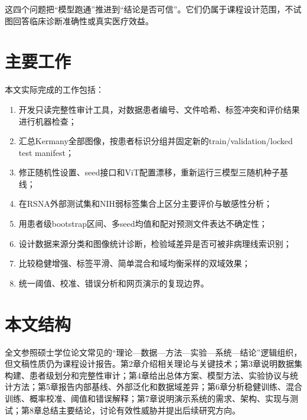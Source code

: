 这四个问题把“模型跑通”推进到“结论是否可信”。它们仍属于课程设计范围，不试图回答临床诊断准确性或真实医疗效益。

\section{主要工作}

本文实际完成的工作包括：

\begin{enumerate}
  \item 开发只读完整性审计工具，对数据患者编号、文件哈希、标签冲突和评价结果进行机器检查；
  \item 汇总Kermany全部图像，按患者标识分组并固定新的train/validation/locked test manifest；
  \item 修正随机性设置、seed接口和ViT配置漂移，重新运行三模型三随机种子基线；
  \item 在RSNA外部测试集和NIH弱标签集合上区分主要评价与敏感性分析；
  \item 用患者级bootstrap区间、多seed均值和配对预测文件表达不确定性；
  \item 设计数据来源分类和图像统计诊断，检验域差异是否可被非病理线索识别；
  \item 比较稳健增强、标签平滑、简单混合和域均衡采样的双域效果；
  \item 统一阈值、校准、错误分析和网页演示的复现边界。
\end{enumerate}

\section{本文结构}

全文参照硕士学位论文常见的“理论—数据—方法—实验—系统—结论”逻辑组织，但文稿性质仍为课程设计报告。第2章介绍相关理论与关键技术；第3章说明数据集构建、患者级划分和完整性审计；第4章给出总体方案、模型方法、实验协议与统计方法；第5章报告内部基线、外部泛化和数据域差异；第6章分析稳健训练、混合训练、概率校准、阈值和错误解释；第7章说明演示系统的需求、架构、实现与测试；第8章总结主要结论，讨论有效性威胁并提出后续研究方向。
